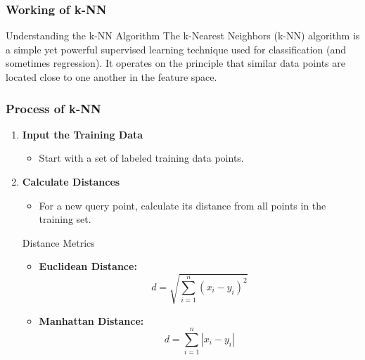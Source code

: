 \documentclass[aspectratio=169]{beamer}
\begin{document}
\begin{frame}
    \frametitle{Working of k-NN}
    \begin{block}{Understanding the k-NN Algorithm}
        The k-Nearest Neighbors (k-NN) algorithm is a simple yet powerful supervised learning technique used for classification (and sometimes regression). It operates on the principle that similar data points are located close to one another in the feature space.
    \end{block}
\end{frame}

\begin{frame}
    \frametitle{Process of k-NN}
    \begin{enumerate}
        \item \textbf{Input the Training Data}
              \begin{itemize}
                  \item Start with a set of labeled training data points.
              \end{itemize}
        \item \textbf{Calculate Distances}
              \begin{itemize}
                  \item For a new query point, calculate its distance from all points in the training set.
              \end{itemize}
              \begin{block}{Distance Metrics}
                  \begin{itemize}
                      \item \textbf{Euclidean Distance:} 
                      \[
                      d = \sqrt{\sum_{i=1}^{n} (x_i - y_i)^2}
                      \]
                      \item \textbf{Manhattan Distance:} 
                      \[
                      d = \sum_{i=1}^{n} |x_i - y_i|
                      \]
                  \end{itemize}
              \end{block}
    \end{enumerate}
\end{frame}
\end{document}
